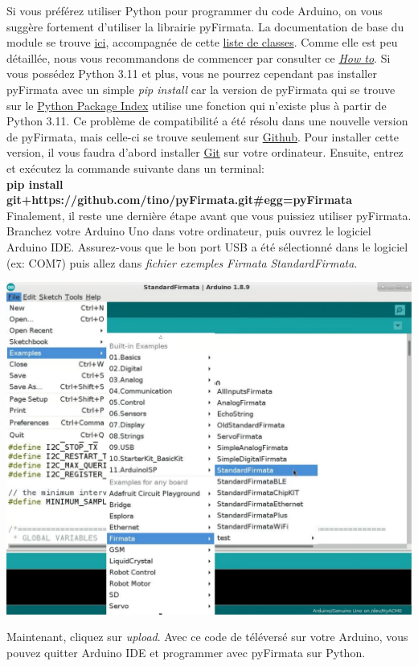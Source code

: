 \documentclass[canadien,12pt,oneside,letterpaper]{article}
\begin{document}
Si vous préférez utiliser Python pour programmer du code Arduino, on vous suggère fortement d'utiliser la librairie pyFirmata. La documentation de base du module se trouve \href{https://pyfirmata.readthedocs.io/en/latest/index.html}{ici}, accompagnée de cette \href{https://pyfirmata.readthedocs.io/en/latest/pyfirmata.html}{liste de classes}. Comme elle est peu détaillée, nous vous recommandons de commencer par consulter ce \textit{\href{https://realpython.com/arduino-python/}{How to}}. Si vous possédez Python 3.11 et plus, vous ne pourrez cependant pas installer pyFirmata avec un simple \textit{pip install} car la version de pyFirmata qui se trouve sur le \href{https://pypi.org/}{Python Package Index} utilise une fonction qui n'existe plus à partir de Python 3.11. Ce problème de compatibilité a été résolu dans une nouvelle version de pyFirmata, mais celle-ci se trouve seulement sur \href{https://github.com/tino/pyFirmata}{Github}. Pour installer cette version, il vous faudra d'abord installer \href{https://git-scm.com/downloads}{Git} sur votre ordinateur. Ensuite, entrez et exécutez la commande suivante dans un terminal:\\ \textbf{pip install git+https://github.com/tino/pyFirmata.git#egg=pyFirmata}
\newline
Finalement, il reste une dernière étape avant que vous puissiez utiliser pyFirmata. Branchez votre Arduino Uno dans votre ordinateur, puis ouvrez le logiciel Arduino IDE. Assurez-vous que le bon port USB a été sélectionné dans le logiciel (ex: COM7) puis allez dans \textit{fichier} \textrightarrow \textit{exemples} \textrightarrow \textit{Firmata} \textrightarrow \textit{StandardFirmata}. 
\begin{center}
    \includegraphics[scale=0.4]{Labos-Complements/Lab07/FirmataSketch.jpeg}
\end{center}
Maintenant, cliquez sur \textit{upload}. Avec ce code de téléversé sur votre Arduino, vous pouvez quitter Arduino IDE et programmer avec pyFirmata sur Python. 
\end{document}
